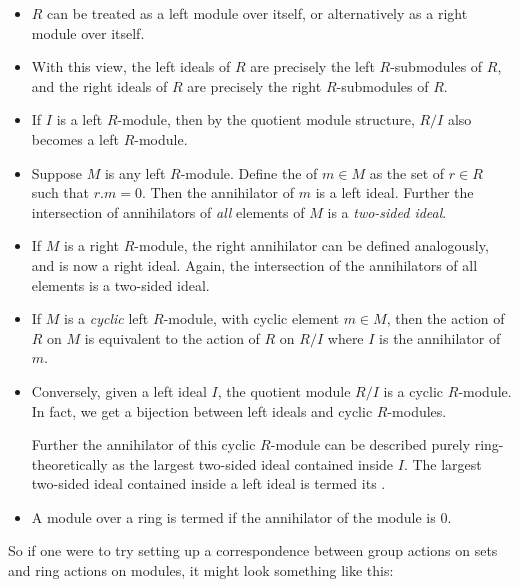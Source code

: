 \documentclass[a4paper]{amsart}
\begin{document}
\begin{itemize}

\item $R$ can be treated as a left module over itself, or
  alternatively as a right module over itself.

\item With this view, the left ideals of $R$ are precisely the left
  $R$-submodules of $R$, and the right ideals of $R$ are precisely the
  right $R$-submodules of $R$.

\item If $I$ is a left $R$-module, then by the quotient module
  structure, $R/I$ also becomes a left $R$-module.

\item Suppose $M$ is any left $R$-module. Define the
   of $m \in M$ as the set of $r \in R$ such
  that $r.m = 0$. Then the annihilator of $m$ is a left ideal. Further
  the intersection of annihilators of {\em all} elements of $M$ is a
  {\em two-sided ideal}.

\item If $M$ is a right $R$-module, the right annihilator can be
  defined analogously, and is now a right ideal. Again, the
  intersection of the annihilators of all elements is a two-sided ideal.

\item If $M$ is a {\em cyclic} left $R$-module, with cyclic element $m
  \in M$, then the action of $R$ on $M$ is equivalent to the action of
  $R$ on $R/I$ where $I$ is the annihilator of $m$.

\item Conversely, given a left ideal $I$, the quotient module $R/I$ is
  a cyclic $R$-module. In fact, we get a bijection between left ideals
  and cyclic $R$-modules.

  Further the annihilator of this cyclic $R$-module can be described
  purely ring-theoretically as the largest two-sided ideal contained
  inside $I$. The largest two-sided ideal contained inside a left
  ideal is termed its .

\item A module over a ring is termed
   if the annihilator of the module
  is $0$.
\end{itemize}

So if one were to try setting up a correspondence between group
actions on sets and ring actions on modules, it might look something
like this:
\end{document}

